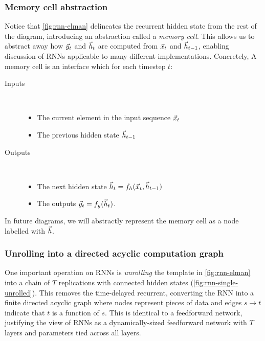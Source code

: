 \subsubsection{Memory cell abstraction}

Notice that \cref{fig:rnn-elman} delineates the recurrent hidden state from
the rest of the diagram, introducing an abstraction called a \emph{memory
cell}. This allows us to abstract away how $\vec{y}_t$ and $\vec{h}_t$ are computed from
$\vec{x}_t$ and $\vec{h}_{t-1}$, enabling discussion of RNNs applicable to many different
implementations. Concretely, A memory cell is an interface which for each
timestep $t$:
\begin{description}
  \item[Inputs]~
    \begin{itemize}
      \item The current element in the input sequence $\vec{x}_t$
      \item The previous hidden state $\vec{h}_{t-1}$
    \end{itemize}
  \item[Outputs]~
    \begin{itemize}
      \item The next  hidden state $\vec{h}_t = f_h (\vec{x}_t, \vec{h}_{t-1})$
      \item The outputs $\vec{y}_t = f_y (\vec{h}_t)$.
    \end{itemize}
\end{description}
In future diagrams, we will abstractly represent the memory cell
as a node labelled with $\vec{h}$.

\subsubsection{Unrolling into a directed acyclic computation graph}

One important operation on RNNs is \emph{unrolling} the template in
\cref{fig:rnn-elman} into a chain of $T$ replications with connected hidden
states (\cref{fig:rnn-single-unrolled}). This removes the time-delayed
recurrent, converting the RNN into a finite directed acyclic graph where nodes
represent pieces of data and edges $s \to t$ indicate that $t$ is a function of
$s$. This is identical to a feedforward network, justifying the view of RNNs as
a dynamically-sized feedforward network with $T$ layers and parameters tied
across all layers.


